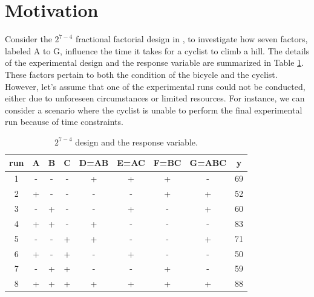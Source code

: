 \documentclass[twoside]{article}
\begin{document}
\section{Motivation}\label{sec2}
Consider the \(2^{7-4}\) fractional factorial design in \cite{BoxH}, to investigate how seven factors, labeled A to G, influence the time it takes for a cyclist to climb a hill. The details of the experimental design and the response variable are summarized in Table \ref{tab1}. These factors pertain to both the condition of the bicycle and the cyclist. However, let's assume that one of the experimental runs could not be conducted, either due to unforeseen circumstances or limited resources. For instance, we can consider a scenario where the cyclist is unable to perform the final experimental run because of time constraints.
\begin{table}[h]
\begin{center}
\small
\caption{${2^{7-4}}$ design and the response variable.}\label{tab1}
\begin{tabular}{c|ccccccc|c}
  \hline
  run & A & B & C & D=AB & E=AC & F=BC & G=ABC & y \\
  \hline
 1& - &- &- &+ &+& + &- &69\\
2& +& -& -& -& -& + &+ &52\\
3& - &+& -& -& +& -& +& 60\\
4& +&+&-&+&-&-&-&83\\
5&-&-&+&+&-&-&+&71\\
6&+&-&+&-&+&-&-&50\\
7&-&+&+&-&-&+&-&59\\
8&+&+&+&+&+&+&+&88\\  \hline
\end{tabular}
\end{center}
\end{table}\\
\end{document}
